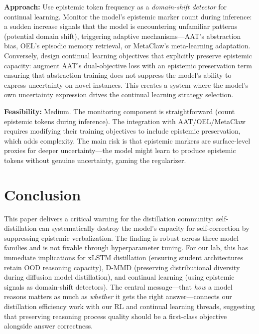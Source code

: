 \documentclass[11pt]{article}
\begin{document}
\textbf{Approach:} Use epistemic token frequency as a \textit{domain-shift detector} for continual learning. Monitor the model's epistemic marker count during inference: a sudden increase signals that the model is encountering unfamiliar patterns (potential domain shift), triggering adaptive mechanisms---AAT's abstraction bias, OEL's episodic memory retrieval, or MetaClaw's meta-learning adaptation. Conversely, design continual learning objectives that explicitly preserve epistemic capacity: augment AAT's dual-objective loss with an epistemic preservation term ensuring that abstraction training does not suppress the model's ability to express uncertainty on novel instances. This creates a system where the model's own uncertainty expression drives the continual learning strategy selection.

\textbf{Feasibility:} Medium. The monitoring component is straightforward (count epistemic tokens during inference). The integration with AAT/OEL/MetaClaw requires modifying their training objectives to include epistemic preservation, which adds complexity. The main risk is that epistemic markers are surface-level proxies for deeper uncertainty---the model might learn to produce epistemic tokens without genuine uncertainty, gaming the regularizer.

\section{Conclusion}

This paper delivers a critical warning for the distillation community: self-distillation can systematically destroy the model's capacity for self-correction by suppressing epistemic verbalization. The finding is robust across three model families and is not fixable through hyperparameter tuning. For our lab, this has immediate implications for xLSTM distillation (ensuring student architectures retain OOD reasoning capacity), D-MMD (preserving distributional diversity during diffusion model distillation), and continual learning (using epistemic signals as domain-shift detectors). The central message---that \textit{how} a model reasons matters as much as \textit{whether} it gets the right answer---connects our distillation efficiency work with our RL and continual learning threads, suggesting that preserving reasoning process quality should be a first-class objective alongside answer correctness.
\end{document}
